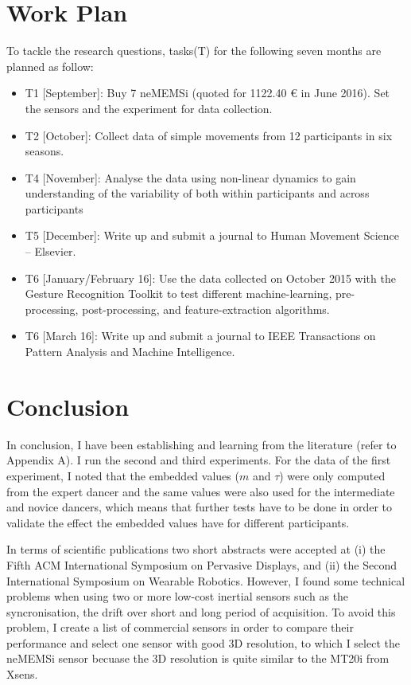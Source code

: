 \documentclass[9pt,journal,onecolumn,compsoc]{IEEEtran}
\begin{document}
\section{Work Plan} 

To tackle the research questions,
tasks(T) for the following seven months are planned as follow:

\begin{itemize}
\item T1 [September]: Buy 7 neMEMSi (quoted for 1122.40 \euro{} in June 2016). Set the sensors and the experiment 
for data collection. 

\item T2 [October]: Collect data of simple movements from 12 participants in six seasons. 

\item T4 [November]: Analyse the data using non-linear dynamics to gain understanding of the 
variability of both within participants and across participants

\item T5 [December]: Write up and submit a journal to Human Movement Science -- Elsevier.

\item T6 [January/February 16]: 
Use the data collected on October 2015 with the Gesture Recognition Toolkit 
to test different machine-learning, pre-processing, post-processing, and feature-extraction algorithms.

\item T6 [March 16]: Write up and submit a journal to IEEE Transactions on Pattern Analysis and Machine Intelligence.
\end{itemize}


\section{Conclusion}
In conclusion, I have been establishing and learning 
from the literature (refer to Appendix A). I run the second and third experiments.
For the data of the first experiment, I noted that the embedded values ($m$ and $\tau$) were 
only computed from the expert dancer and the same values were also used for 
the intermediate and novice dancers, which means that further tests have to be done in order to validate the 
effect the embedded values have for different participants.

In terms of scientific publications two short abstracts were accepted at
(i) the Fifth ACM International Symposium on Pervasive Displays, and 
(ii) the Second International Symposium on Wearable Robotics.
However, I found some technical problems when using two or more 
low-cost inertial sensors such as the syncronisation, the drift over short and long period of acquisition.
To avoid this problem, I create a list of commercial sensors in order to compare their performance and select
one sensor with good 3D resolution, to which I select the neMEMSi sensor
becuase the 3D resolution is quite similar to the MT20i from Xsens.
\end{document}
